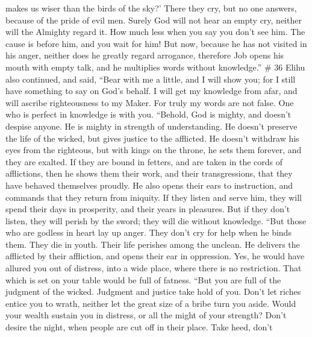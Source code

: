 makes us wiser than the birds of the sky?'  There they
cry, but no one answers, because of the pride of evil men.
 Surely God will not hear an empty cry, neither will the
Almighty regard it.  How much less when you say you don't
see him. The cause is before him, and you wait for him! 
But now, because he has not visited in his anger, neither does he
greatly regard arrogance,  therefore Job opens his mouth
with empty talk, and he multiplies words without knowledge.'' \# 36
 Elihu also continued, and said,  ``Bear
with me a little, and I will show you; for I still have something to say
on God's behalf.  I will get my knowledge from afar, and
will ascribe righteousness to my Maker.  For truly my
words are not false. One who is perfect in knowledge is with you.
 ``Behold, God is mighty, and doesn't despise anyone. He
is mighty in strength of understanding.  He doesn't
preserve the life of the wicked, but gives justice to the afflicted.
 He doesn't withdraw his eyes from the righteous, but with
kings on the throne, he sets them forever, and they are exalted.
 If they are bound in fetters, and are taken in the cords
of afflictions,  then he shows them their work, and their
transgressions, that they have behaved themselves proudly.
 He also opens their ears to instruction, and commands
that they return from iniquity.  If they listen and serve
him, they will spend their days in prosperity, and their years in
pleasures.  But if they don't listen, they will perish by
the sword; they will die without knowledge.  ``But those
who are godless in heart lay up anger. They don't cry for help when he
binds them.  They die in youth. Their life perishes among
the unclean.  He delivers the afflicted by their
affliction, and opens their ear in oppression.  Yes, he
would have allured you out of distress, into a wide place, where there
is no restriction. That which is set on your table would be full of
fatness.  ``But you are full of the judgment of the
wicked. Judgment and justice take hold of you.  Don't let
riches entice you to wrath, neither let the great size of a bribe turn
you aside.  Would your wealth sustain you in distress, or
all the might of your strength?  Don't desire the night,
when people are cut off in their place.  Take heed, don't
